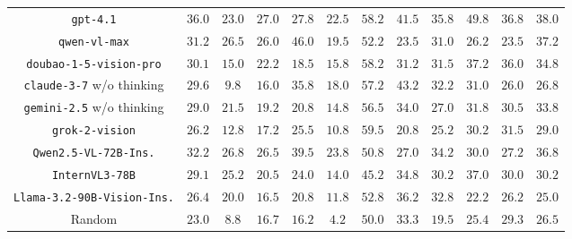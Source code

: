 \begin{table}[t]
\begin{tabular}{cccccccccccc}
\texttt{gpt-4.1} & $36.0$ & $23.0$ & \cellcolor{second} $27.0$ & $27.8$ & $22.5$ & $58.2$ & $41.5$ & \cellcolor{first} $35.8$ & $49.8$ & $36.8$ & $38.0$ \\
\texttt{qwen-vl-max} & $31.2$ & $26.5$ & $26.0$ & \cellcolor{first} $46.0$ & $19.5$ & $52.2$ & \cellcolor{below} $23.5$ & $31.0$ & $26.2$ & \cellcolor{below} $23.5$ & $37.2$ \\
\texttt{doubao-1-5-vision-pro} & $30.1$ & $15.0$ & $22.2$ & $18.5$ & $15.8$ & $58.2$ & \cellcolor{below} $31.2$ & $31.5$ & $37.2$ & $36.0$ & $34.8$ \\
\texttt{claude-3-7} w/o thinking & $29.6$ & $9.8$ & \cellcolor{below} $16.0$ & $35.8$ & $18.0$ & $57.2$ & \cellcolor{third} $43.2$ & $32.2$ & $31.0$ & \cellcolor{below} $26.0$ & $26.8$ \\
\texttt{gemini-2.5} w/o thinking & $29.0$ & $21.5$ & $19.2$ & $20.8$ & $14.8$ & $56.5$ & $34.0$ & $27.0$ & $31.8$ & $30.5$ & $33.8$ \\
\texttt{grok-2-vision} & $26.2$ & $12.8$ & $17.2$ & $25.5$ & $10.8$ & $59.5$ & \cellcolor{below} $20.8$ & $25.2$ & $30.2$ & $31.5$ & $29.0$ \\
\midrule
\texttt{Qwen2.5-VL-72B-Ins.} & $32.2$ & $26.8$ & \cellcolor{third} $26.5$ & \cellcolor{second} $39.5$ & $23.8$ & $50.8$ & \cellcolor{below} $27.0$ & $34.2$ & $30.0$ & \cellcolor{below} $27.2$ & $36.8$ \\
\texttt{InternVL3-78B} & $29.1$ & $25.2$ & $20.5$ & $24.0$ & $14.0$ & \cellcolor{below} $45.2$ & $34.8$ & $30.2$ & $37.0$ & $30.0$ & $30.2$ \\
\texttt{Llama-3.2-90B-Vision-Ins.} & $26.4$ & $20.0$ & \cellcolor{below} $16.5$ & $20.8$ & $11.8$ & $52.8$ & $36.2$ & $32.8$ & \cellcolor{below} $22.2$ & \cellcolor{below} $26.2$ & \cellcolor{below} $25.0$ \\
\midrule
Random & $23.0$ & $8.8$ & $16.7$ & $16.2$ & $4.2$ & $50.0$ & $33.3$ & $19.5$ & $25.4$ & $29.3$ & $26.5$ \\
\bottomrule
\end{tabular}
\end{table}
